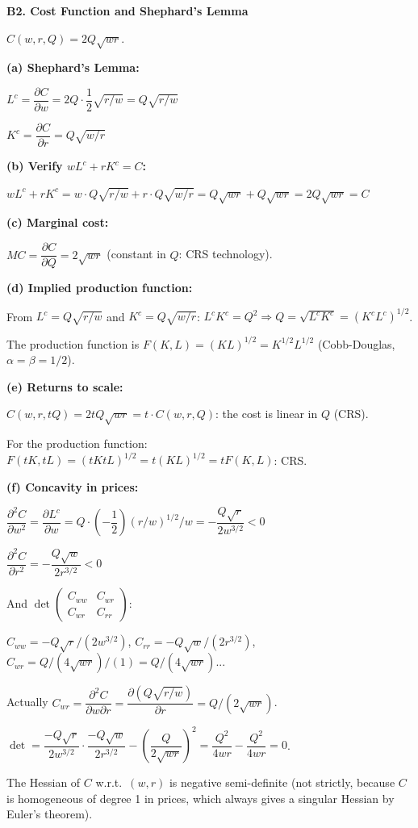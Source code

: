 \documentclass[12pt, a4paper]{article}
\theoremstyle{definition}
\newcommand{\pp}[2]{\dfrac{\partial #1}{\partial #2}}
\newcommand{\ppp}[2]{\dfrac{\partial^{2} #1}{\partial #2^{2}}}
\begin{document}
\begin{solbox}
\textbf{B2. Cost Function and Shephard's Lemma}

$C(w,r,Q) = 2Q\sqrt{wr}$.

\textbf{(a) Shephard's Lemma:}

$L^c = \pp{C}{w} = 2Q\cdot\dfrac{1}{2}\sqrt{r/w} = Q\sqrt{r/w}$

$K^c = \pp{C}{r} = Q\sqrt{w/r}$

\textbf{(b) Verify $wL^c + rK^c = C$:}

$wL^c + rK^c = w\cdot Q\sqrt{r/w} + r\cdot Q\sqrt{w/r}
= Q\sqrt{wr} + Q\sqrt{wr} = 2Q\sqrt{wr} = C$ \checkmark

\textbf{(c) Marginal cost:}

$MC = \pp{C}{Q} = 2\sqrt{wr}$ (constant in $Q$: CRS technology).

\textbf{(d) Implied production function:}

From $L^c = Q\sqrt{r/w}$ and $K^c = Q\sqrt{w/r}$:
$L^c K^c = Q^2 \Rightarrow Q = \sqrt{L^c K^c} = (K^c L^c)^{1/2}$.

The production function is $F(K,L) = (KL)^{1/2} = K^{1/2}L^{1/2}$ (Cobb-Douglas, $\alpha=\beta=1/2$).

\textbf{(e) Returns to scale:}

$C(w,r,tQ) = 2tQ\sqrt{wr} = t\cdot C(w,r,Q)$: the cost is linear in $Q$ (CRS).

For the production function: $F(tK,tL) = (tKtL)^{1/2} = t(KL)^{1/2} = tF(K,L)$: CRS. \checkmark

\textbf{(f) Concavity in prices:}

$\ppp{C}{w} = \pp{L^c}{w} = Q\cdot\left(-\dfrac{1}{2}\right)(r/w)^{1/2}/w
= -\dfrac{Q\sqrt{r}}{2w^{3/2}} < 0$ \checkmark

$\ppp{C}{r} = -\dfrac{Q\sqrt{w}}{2r^{3/2}} < 0$ \checkmark

And $\det\begin{pmatrix}C_{ww}&C_{wr}\\C_{wr}&C_{rr}\end{pmatrix}$:

$C_{ww} = -Q\sqrt{r}/(2w^{3/2})$, $C_{rr}=-Q\sqrt{w}/(2r^{3/2})$,
$C_{wr}=Q/(4\sqrt{wr})/(1) = Q/(4\sqrt{wr})$... 

Actually $C_{wr} = \pp{^2C}{w\partial r} = \pp{(Q\sqrt{r/w})}{r} = Q/(2\sqrt{wr})$.

$\det = \dfrac{-Q\sqrt{r}}{2w^{3/2}}\cdot\dfrac{-Q\sqrt{w}}{2r^{3/2}} - \left(\dfrac{Q}{2\sqrt{wr}}\right)^2
= \dfrac{Q^2}{4wr} - \dfrac{Q^2}{4wr} = 0$.

The Hessian of $C$ w.r.t.\ $(w,r)$ is negative semi-definite (not strictly, because $C$ is homogeneous of degree 1 in prices, which always gives a singular Hessian by Euler's theorem).
\end{solbox}
\end{document}
